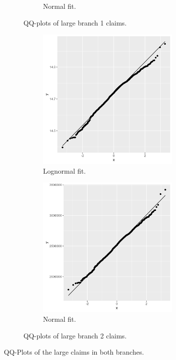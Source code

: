 \documentclass[11pt]{article}
\begin{document}
\begin{figure}[!h]
\begin{subfigure}{.49\textwidth}
\begin{subfigure}{.5\textwidth}
      \caption{Normal fit.}
    \end{subfigure}
    \caption{QQ-plots of large branch 1 claims.}
\end{subfigure}
\begin{subfigure}{0.49\textwidth}
    \begin{subfigure}{.5\textwidth}
      \centering
      \includegraphics[width=.9\linewidth]{plots/claim_type2/qqplot_lognormality.png}
      \caption{Lognormal fit.}
    \end{subfigure}%
    \begin{subfigure}{.5\textwidth}
      \centering
      \includegraphics[width=.9\linewidth]{plots/claim_type2/qqplot_normality.png}
      \caption{Normal fit.}
    \end{subfigure}
    \caption{QQ-plots of large branch 2 claims.}
\end{subfigure}
    \caption{QQ-Plots of the large claims in both branches.}
    \label{a2:largeqq}
\end{figure}
\end{document}

